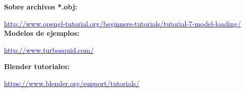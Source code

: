 \documentclass[a4paper]{article}
\newcounter{col}
\begin{document}
\textbf{Sobre archivos *.obj:}

\href{http://www.opengl-tutorial.org/beginners-tutorials/tutorial-7-model-loading/}{\textcolor{blue}{http://www.opengl-tutorial.org/beginners-tutorials/tutorial-7-model-loading/}}\\

\textbf{Modelos de ejemplos:}

\href{http://www.turbosquid.com/search/3d-models/blend?keyword=&file_type=119&media_typeid=2&search_type=free}{\textcolor{blue}{http://www.turbosquid.com/}}

\textbf{Blender tutoriales:}

\href{https://www.blender.org/support/tutorials/}{\textcolor{blue}{https://www.blender.org/support/tutorials/}}
\end{document}
